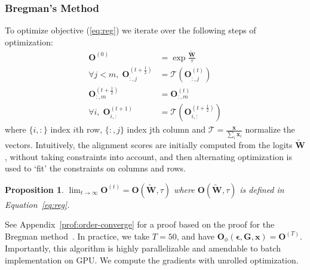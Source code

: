 \documentclass[11pt]{article}
\newtheorem{prop}{Proposition}
\begin{document}
\subsubsection{Bregman's Method}
To optimize objective (\ref{eq:reg}) we iterate over the following steps of optimization: \begin{align}
    \mathbf{O}^{(0)} &= \exp \frac{ \widetilde{\mathbf{W}}}{\tau}  \label{eq:init}  \\
\forall j < m,\; \mathbf{O}^{(t+\frac{1}{2})}_{:,j} & =  \mathcal{T}(\mathbf{O}^{(t)}_{:,j}) \label{eq:column}\\
  \mathbf{O}^{(t+\frac{1}{2})}_{:,m}  &=  \mathbf{O}^{(t)}_{:,m}  \label{eq:fix} \\
 \forall i,\; \mathbf{O}^{(t+1)}_{i,:} &= \mathcal{T}( \mathbf{O}^{(t+\frac{1}{2})}_{i,:}) \label{eq:row} 
\end{align}
where  $\{i,:\}$ index $i$th row, $\{:,j\}$ index jth column and $ \mathcal{T} = \frac{\mathbf{x}}{\sum_{i}\mathbf{x}_i}$ normalize the vectors. Intuitively, the alignment scores are initially computed from the logits $\widetilde{\mathbf{W}}$, without taking constraints into account, and then alternating optimization is used to `fit' the constraints on columns and rows.



\begin{prop}\label{prop:order-converge}
$\lim_{t\rightarrow \infty}   \mathbf{O}^{(t)} = \mathbf{O}( \widetilde{ \mathbf{W}},\tau) $ where $\mathbf{O}( \widetilde{ \mathbf{W}},\tau) $ is defined in Equation~\ref{eq:reg}.
\end{prop}
See Appendix~\ref{prof:order-converge} for a proof based on the proof for the Bregman method~\cite{Bregman1967TheRM}. In practice, we take $T=50$, and have $  \mathbf{O}_\phi(\mathbf{\epsilon},\mathbf{G},\mathbf{x})= \mathbf{O}^{(T)}$. Importantly, this algorithm is highly parallelizable and amendable to batch implementation on GPU. We compute the gradients with unrolled optimization. 
\end{document}
